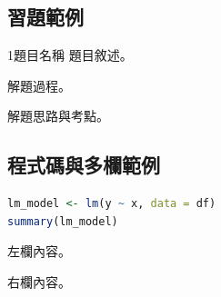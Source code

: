 \subsection{習題範例}

\begin{examplebox}{1}{題目名稱}
題目敘述。
\end{examplebox}

\begin{solutionbox}
解題過程。
\end{solutionbox}

\begin{analysisbox}
解題思路與考點。
\end{analysisbox}

\subsection{程式碼與多欄範例}

\begin{lstlisting}[language=R]
lm_model <- lm(y ~ x, data = df)
summary(lm_model)
\end{lstlisting}

\noindent
\begin{minipage}[t]{0.48\textwidth}
左欄內容。
\end{minipage}
\hfill
\begin{minipage}[t]{0.48\textwidth}
右欄內容。
\end{minipage}

